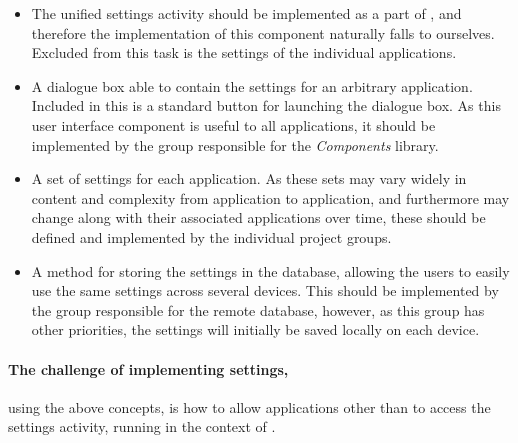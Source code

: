 \begin{itemize}
	\item The unified settings activity should be implemented as a part of \launcher, and therefore the implementation of this component naturally falls to ourselves. 
	Excluded from this task is the settings of the individual applications.
	
	\item A dialogue box able to contain the settings for an arbitrary \giraf application. 
	Included in this is a standard button for launching the dialogue box. 
	As this user interface component is useful to all applications, it should be implemented by the group responsible for the \textit{\giraf Components} library.
	
	\item A set of settings for each \giraf application.
	As these sets may vary widely in content and complexity from application to application, and furthermore may change along with their associated applications over time, these should be defined and implemented by the individual project groups. 
	
	\item A method for storing the settings in the database, allowing the users to easily use the same settings across several devices. 
	This should be implemented by the group responsible for the remote database, however, as this group has other priorities, the settings will initially be saved locally on each device.
\end{itemize}

\paragraph{The challenge of implementing settings,} using the above concepts, is how to allow applications other than \launcher to access the settings activity, running in the context of \launcher.

